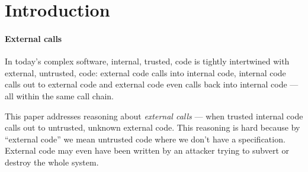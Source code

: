 



\section{Introduction}
\label{s:intro}

\paragraph{External calls}

In today's complex software, internal, trusted, code  is tightly intertwined  with external, untrusted, code: external code
calls into internal code, internal code calls
out to external code  and external code  even calls back  into internal code --- all within the same call chain.


This paper addresses reasoning about \emph{external calls} --- when
trusted internal code calls out to untrusted, unknown external code.
This reasoning is hard because by ``external code'' we mean untrusted
code where we don't have a specification.
External code may even have been written by an attacker trying to subvert or destroy the whole system.  
 

\vspace*{1mm}


